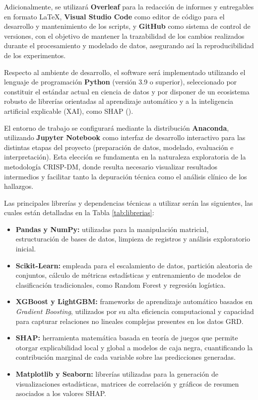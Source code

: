Adicionalmente, se utilizará \textbf{Overleaf} para la redacción de informes y entregables en formato LaTeX, \textbf{Visual Studio Code} como editor de código para el desarrollo y mantenimiento de los scripts, y \textbf{GitHub} como sistema de control de versiones, con el objetivo de mantener la trazabilidad de los cambios realizados durante el procesamiento y modelado de datos, asegurando así la reproducibilidad de los experimentos.

Respecto al ambiente de desarrollo, el software será implementado utilizando el lenguaje de programación \textbf{Python} (versión 3.9 o superior), seleccionado por constituir el estándar actual en ciencia de datos y por disponer de un ecosistema robusto de librerías orientadas al aprendizaje automático y a la inteligencia artificial explicable (XAI), como SHAP (\cite{raschka2020machine, molnar2020interpretable}).

El entorno de trabajo se configurará mediante la distribución \textbf{Anaconda}, utilizando \textbf{Jupyter Notebook} como interfaz de desarrollo interactivo para las distintas etapas del proyecto (preparación de datos, modelado, evaluación e interpretación). Esta elección se fundamenta en la naturaleza exploratoria de la metodología CRISP-DM, donde resulta necesario visualizar resultados intermedios y facilitar tanto la depuración técnica como el análisis clínico de los hallazgos.

Las principales librerías y dependencias técnicas a utilizar serán las siguientes, las cuales están detalladas en la Tabla \ref{tab:librerias}:

\begin{itemize}
\item \textbf{Pandas y NumPy:} utilizadas para la manipulación matricial, estructuración de bases de datos, limpieza de registros y análisis exploratorio inicial.
\item \textbf{Scikit-Learn:} empleada para el escalamiento de datos, partición aleatoria de conjuntos, cálculo de métricas estadísticas y entrenamiento de modelos de clasificación tradicionales, como Random Forest y regresión logística.
\item \textbf{XGBoost y LightGBM:} frameworks de aprendizaje automático basados en \textit{Gradient Boosting}, utilizados por su alta eficiencia computacional y capacidad para capturar relaciones no lineales complejas presentes en los datos GRD.
\item \textbf{SHAP:} herramienta matemática basada en teoría de juegos que permite otorgar explicabilidad local y global a modelos de caja negra, cuantificando la contribución marginal de cada variable sobre las predicciones generadas.
\item \textbf{Matplotlib y Seaborn:} librerías utilizadas para la generación de visualizaciones estadísticas, matrices de correlación y gráficos de resumen asociados a los valores SHAP.
\end{itemize}


